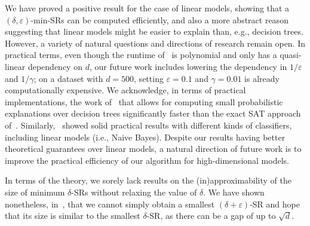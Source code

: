 We have proved a positive result for the case of linear models, showing that a $(\delta, \varepsilon)$-min-SRs can be computed efficiently, and also a more abstract reason suggesting that linear models might be easier to explain than, e.g., decision trees. However,  a variety of natural questions and directions of research remain open. In practical terms, even though the runtime of~ is polynomial and only has a quasi-linear dependency on $d$, our future work includes lowering the dependency in $1/\varepsilon$ and $1/\gamma$; on a dataset with $d = 500$, setting $\varepsilon = 0.1$ and $\gamma = 0.01$ is already computationally expensive. 
We acknowledge, in terms of practical implementations, the work of~\citet{Louenas,izza2024locallyminimalprobabilisticexplanations} that allows for computing small probabilistic explanations over decision trees significantly faster than the exact SAT approach of~\citet{NEURIPS2022_b8963f6a}.
Similarly,~\citet{izzaComputingProbabilisticAbductive2023} showed solid practical results with different kinds of classifiers, including linear models (i.e., Naive Bayes). Despite our results having better theoretical guarantees over linear models, a natural direction of future work is to improve the practical efficiency of our algorithm for high-dimensional models.

In terms of the theory, we sorely lack results on the (in)approximability of the size of minimum $\delta$-SRs without relaxing the value of $\delta$. We have shown nonetheless, in~, that we cannot simply obtain a smallest $(\delta + \varepsilon)$-SR and hope that its size is similar to the smallest $\delta$-SR, as there can be a gap of up to $\sqrt{d}$.

